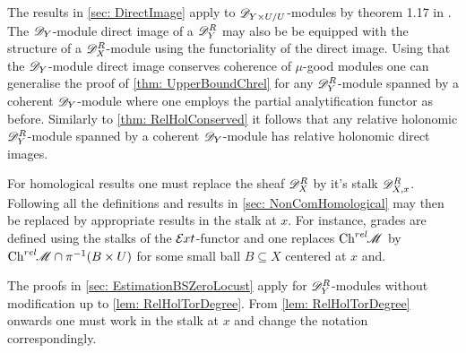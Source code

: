 The results in \cref{sec: DirectImage} apply to $\mathscr{D}_{Y\times U/U}$-modules by theorem 1.17 in \cite{monteiro2016riemann}.
The $\mathscr{D}_Y$-module direct image of a $\mathscr{D}_Y^R$ may also be be equipped with the structure of a $\mathscr{D}_X^R$-module using the functoriality of the direct image.
Using that the $\mathscr{D}_Y$-module direct image conserves coherence of $\mu$-good modules one can generalise the proof of \cref{thm: UpperBoundChrel} for any $\mathscr{D}_Y^R$-module spanned by a coherent $\mathscr{D}_Y$-module where one employs the partial analytification functor as before.
Similarly to \cref{thm: RelHolConserved} it follows that any relative holonomic $\mathscr{D}_Y^R$-module spanned by a coherent $\mathscr{D}_Y$-module has relative holonomic direct images.

For homological results one must replace the sheaf $\mathscr{D}_X^R$ by it's stalk $\mathscr{D}_{X,x}^R$.
Following \cite{budur2019zero} all the definitions and results in \cref{sec: NonComHomological} may then be replaced by appropriate results in the stalk at $x$.
For instance, grades are defined using the stalks of the $\mathcal{E}\mkern -1mu xt$-functor and one replaces $\operatorname{Ch}^{rel}\mkern-5mu\mathscr{M}$ by $\operatorname{Ch}^{rel}\mkern-5mu\mathscr{M}\cap \pi^{-1}(B\times U)$ for some small ball $B\subseteq X$ centered at $x$ and.

The proofs in \cref{sec: EstimationBSZeroLocust} apply for $\mathscr{D}_Y^R$-modules without modification up to \cref{lem: RelHolTorDegree}.
From \cref{lem: RelHolTorDegree} onwards one must work in the stalk at $x$ and change the notation correspondingly.
